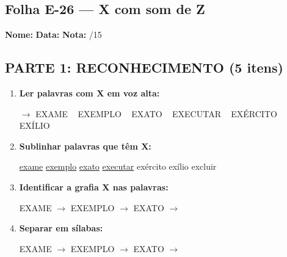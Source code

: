 \subsection{Folha E-26 --- X com som de Z}
\begin{exercicio}



\noindent\textbf{Nome:} \underline{\hspace{3.2cm}} \quad \textbf{Data:} \underline{\hspace{1.6cm}} \quad \textbf{Nota:} \underline{\hspace{0.9cm}}/15


\subsection*{PARTE 1: RECONHECIMENTO (5 itens)}

\begin{enumerate}

  \item \textbf{Ler palavras com X em voz alta:}
  \begin{center}
  $\rightarrow$ EXAME ~ EXEMPLO ~ EXATO ~ EXECUTAR ~ EXÉRCITO ~ EXÍLIO
  \end{center}

  \item \textbf{Sublinhar palavras que têm X:}

\begin{center}
  \uline{exame} \quad \uline{exemplo} \quad \uline{exato} \quad \uline{executar} \quad exército \quad exílio \quad excluir
\end{center}

  \item \textbf{Identificar a grafia X nas palavras:}
  \begin{center}
  EXAME $\rightarrow$ \underline{\hspace{1cm}} \quad EXEMPLO $\rightarrow$ \underline{\hspace{1cm}} \quad EXATO $\rightarrow$ \underline{\hspace{1cm}}
  \end{center}

  \item \textbf{Separar em sílabas:}
  \begin{center}
  EXAME $\rightarrow$ \underline{\hspace{1.2cm}} \quad EXEMPLO $\rightarrow$ \underline{\hspace{1.2cm}} \quad EXATO $\rightarrow$ \underline{\hspace{1.2cm}}
  \end{center}


\end{enumerate}
\end{exercicio}
